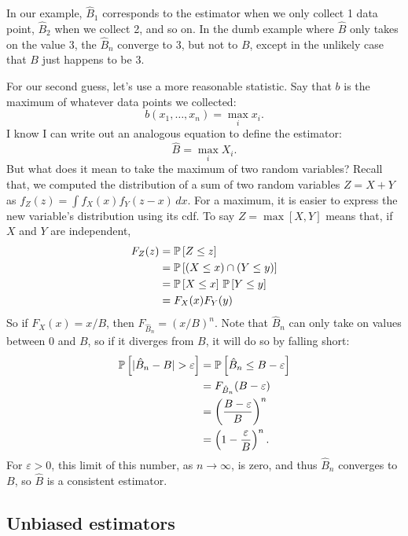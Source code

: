 In our example, $\hat{B}_1$ corresponds to the estimator when we only collect
1 data point, $\hat{B}_2$ when we collect 2, and so on. In the dumb example
where $\hat{B}$ only takes on the value 3, the $\hat{B}_n$ converge to 3, but not
to $B$, except in the unlikely case that $B$ just happens to be 3.

For our second guess, let's use a more reasonable statistic. Say that $b$
is the maximum of whatever data points we collected:
\begin{equation*}
    b(x_1, \ldots, x_n) = \max_i x_i.
\end{equation*}
I know I can write out an analogous equation to define the estimator:
\begin{equation*}
    \hat{B} = \max_i X_i.
\end{equation*}
But what does it mean to take the maximum of two random variables? Recall that,
we computed the distribution of a sum of two random variables $Z = X + Y$ as
$f_Z(z) = \int f_X(x) f_Y(z-x) \,dx$. For a maximum, it is easier to express the
new variable's distribution using its cdf. To say $Z = \max[X, Y]$ means that,
if $X$ and $Y$ are independent,
\begin{align*}
    F_Z(z) &= \mathbb{P}\left[{Z \leq z}\right] \\
    &= \mathbb{P}\left[{(X \leq x) \cap (Y \leq y)}\right] \\
    &= \mathbb{P}\left[{X \leq x}\right] \, \mathbb{P}\left[{Y \leq y}\right] \\
    &= F_X(x) F_Y(y)
\end{align*}
So if $F_X(x) = x/B$, then $F_{\hat{B}_n} = (x/B)^n$. Note that $\hat{B}_n$ can
only take on values between $0$ and $B$, so if it diverges from $B$, it will do
so by falling short:
\begin{align*}
    \mathbb{P}\left[{|\hat{B}_n - B| > \varepsilon}\right]
    &= \mathbb{P}\left[{\hat{B}_n \leq B - \varepsilon}\right] \\
    &= F_{\hat{B}_n}(B - \varepsilon) \\
    &= \left(\frac{B - \varepsilon}{B}\right)^n \\
    &= \left(1 - \frac{\varepsilon}{B}\right)^n.
\end{align*}
For $\varepsilon > 0$, this limit of this number, as $n \to \infty$, is zero,
and thus $\hat{B}_n$ converges to $B$, so $\hat{B}$ is a consistent estimator.

\subsection{Unbiased estimators}

